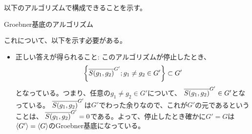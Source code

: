 \documentclass[9pt]{ltjsarticle}
\begin{document}
\begin{myproof}
  以下のアルゴリズムで構成できることを示す。
\begin{algorithm}[H]
  \caption{Groebner基底のアルゴリズム}
  \begin{algorithmic}[1]
    \REPEAT{}
  \end{algorithmic}
\end{algorithm}
これについて、以下を示す必要がある。
\begin{itemize}
  \item 正しい答えが得られること:
  このアルゴリズムが停止したとき、
  \begin{align}
    \left\{\overline{S(g_1,g_2)}^{G'} ; g_1 \neq g_2 \in G'\right\} \subset G'
  \end{align}
  となっている。つまり、任意の$g_1\neq g_2 \in G'$について、
  $\overline{S(g_1,g_2)}^{G'}\in G'$となっている。
  $\overline{S(g_1,g_2)}^{G'}$は$G'$でわった余りなので、これが$G'$の元であるということは、
  $\overline{S(g_1,g_2)}^{G'} = 0$である。よって、停止したとき確かに$G'=G$は
  $\left\langle G' \right\rangle=\left\langle G \right\rangle$のGroebner基底になっている。


\end{itemize}
\end{myproof}
\end{document}
